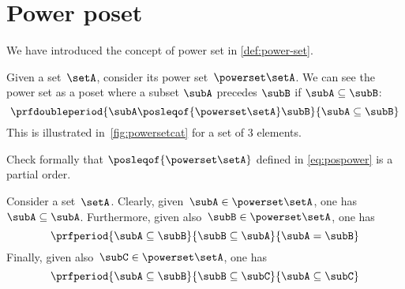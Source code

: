 \section{Power poset}

We have introduced the concept of power set in \cref{def:power-set}.

\begin{definition}
    \label{ex:hasseinclusion}
    Given a set~$\setA$, consider its power set~$\powerset\setA$.
    We can see the power set as a poset where a subset $\subA$ precedes $\subB$ if $\subA \subseteq \subB$:
    \begin{equation}\label{eq:pospower}
        \prfdoubleperiod{
            \subA \posleqof{\powerset\setA} \subB
        }{
            \subA \subseteq \subB
        }
    \end{equation}
    This is illustrated in~\cref{fig:powersetcat} for a set of 3 elements.
\end{definition}
\begin{exercise}
    Check formally that $\posleqof{\powerset\setA}$ defined in \cref{eq:pospower} is a partial order.
\end{exercise}
\begin{solution}
    Consider a set~$\setA$.
    Clearly, given~$\subA\in \powerset \setA$, one has~$\subA\subseteq \subA$.
    Furthermore, given also~$\subB\in \powerset \setA$, one has
    \begin{equation*}
        \prfperiod{\subA\subseteq \subB}{\subB\subseteq \subA}{\subA=\subB}
    \end{equation*}
    Finally, given also~$\subC\in \powerset \setA$, one has
    \begin{equation*}
        \prfperiod{\subA\subseteq \subB}{\subB\subseteq \subC}{\subA\subseteq\subC}
    \end{equation*}
\end{solution}

\begin{figure*}[h]
    \centering
    \hfill
    \hfill
    \hfill
    \caption{Power set as a poset.
    }
    \label{fig:powersetcat}
\end{figure*}

